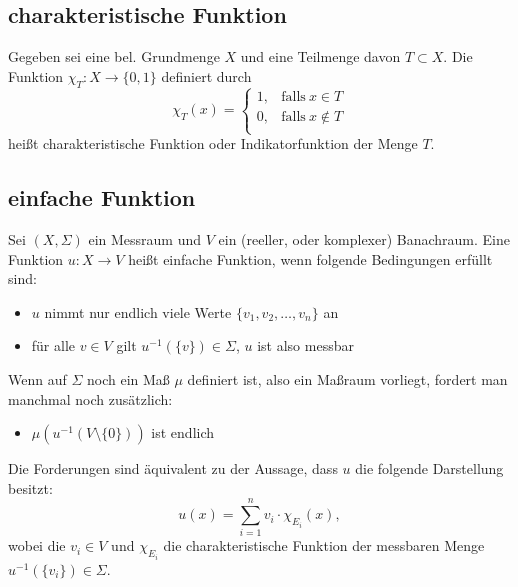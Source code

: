 \documentclass[paper=a4,10pt]{scrartcl}
\begin{document}
\subsection{charakteristische Funktion}
Gegeben sei eine bel. Grundmenge $X$ und eine Teilmenge davon $T \subset X$. Die Funktion $\chi_T: X \rightarrow \{0, 1\}$ definiert durch
\begin{equation}
\chi_T(x) = \begin{cases}
      1, & \text{falls}\ x \in T \\
      0, & \text{falls}\ x \not\in T \\
    \end{cases}
\end{equation}
heißt charakteristische Funktion oder Indikatorfunktion der Menge $T$.

\subsection{einfache Funktion}
Sei $(X, \Sigma)$ ein Messraum und $V$ ein (reeller, oder komplexer) Banachraum. Eine Funktion $u: X \rightarrow V$ heißt einfache Funktion, wenn folgende Bedingungen erfüllt sind:
\begin{itemize}
\item $u$ nimmt nur endlich viele Werte $\{ v_1, v_2, \dots, v_n\}$ an 
\item für alle $v \in V$ gilt $u^{-1}(\{v\}) \in \Sigma$, $u$ ist also messbar
\end{itemize}
Wenn auf $\Sigma$ noch ein Maß $\mu$ definiert ist, also ein Maßraum vorliegt, fordert man manchmal noch zusätzlich:
\begin{itemize}
\item $\mu(u^{-1}(V \setminus\{0\}))$ ist endlich
\end{itemize}

\noindent
Die Forderungen sind äquivalent zu der Aussage, dass $u$ die folgende Darstellung besitzt:
\begin{equation}
u(x) = \sum^n_{i=1}v_i \cdot \chi_{E_i}(x),
\end{equation}
wobei die $v_i \in V$ und $\chi_{E_i}$ die charakteristische Funktion der messbaren Menge $u^{-1}(\{v_i\}) \in \Sigma$. \\
\end{document}
